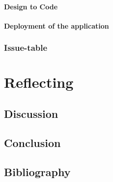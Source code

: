 \documentclass[a4paper]{report}
\theoremstyle{plain}
\begin{document}
    \subsection{Design to Code}
    \subsection{Deployment of the application}    

\section{Issue-table}

\part{Reflecting}    
\clearpage    
\chapter{Discussion}

\clearpage
\chapter{Conclusion}

\clearpage
\chapter{Bibliography}


\end{document}
